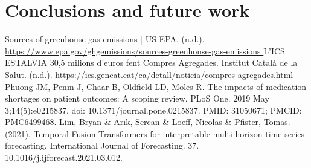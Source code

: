 \documentclass[11pt,twocolumn]{article}
\begin{document}
\section{Conclusions and future work}



\newpage
\onecolumn
\begin{thebibliography}{}
     Sources of greenhouse gas emissions | US EPA. (n.d.). \url{https://www.epa.gov/ghgemissions/sources-greenhouse-gas-emissions }
     L’ICS ESTALVIA 30,5 milions d’euros fent Compres Agregades. Institut Català de la Salut. (n.d.). \url{https://ics.gencat.cat/ca/detall/noticia/compres-agregades.html}
     Phuong JM, Penm J, Chaar B, Oldfield LD, Moles R. The impacts of medication shortages on patient outcomes: A scoping review. PLoS One. 2019 May 3;14(5):e0215837. doi: 10.1371/journal.pone.0215837. PMID: 31050671; PMCID: PMC6499468.
     Lim, Bryan \& Arık, Sercan \& Loeff, Nicolas \& Pfister, Tomas. (2021). Temporal Fusion Transformers for interpretable multi-horizon time series forecasting. International Journal of Forecasting. 37. 10.1016/j.ijforecast.2021.03.012. 
\end{thebibliography}
\end{document}
